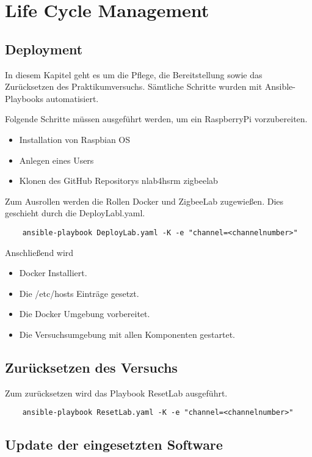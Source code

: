 \chapter{Life Cycle Management}
\section{Deployment}
In diesem Kapitel geht es um die Pflege, die Bereitstellung sowie das Zurücksetzen des Praktikumversuchs. Sämtliche Schritte wurden mit Ansible-Playbooks
automatisiert.

Folgende Schritte müssen ausgeführt werden, um ein RaspberryPi vorzubereiten.
\begin{itemize}
    \item Installation von Raspbian OS
    \item Anlegen eines Users
    \item Klonen des GitHub Repositorys nlab4hsrm zigbeelab
\end{itemize}

Zum Ausrollen werden die Rollen \grqq Docker\grqq{} und \grqq ZigbeeLab\grqq{} zugewießen. Dies geschieht durch die DeployLabl.yaml.
\begin{lstlisting}
    ansible-playbook DeployLab.yaml -K -e "channel=<channelnumber>"
\end{lstlisting}

Anschließend wird
\begin{itemize}
    \item Docker Installiert.
    \item Die /etc/hosts Einträge gesetzt.
    \item Die Docker Umgebung vorbereitet.
    \item Die Versuchsumgebung mit allen Komponenten gestartet.
\end{itemize}

\section{Zurücksetzen des Versuchs}

Zum zurücksetzen wird das Playbook \grqq ResetLab\grqq{} ausgeführt.

\begin{lstlisting}
    ansible-playbook ResetLab.yaml -K -e "channel=<channelnumber>"
\end{lstlisting}

\section{Update der eingesetzten Software}

